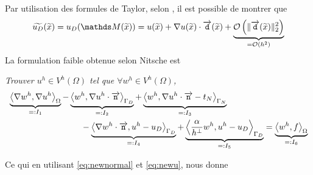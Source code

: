 \noindent Par utilisation des formules de Taylor, selon \citet{main_shifted_2018}, il est possible de montrer que
\begin{equation}
	\widetilde{u_D}(\widetilde{x})  = u_D (\mapgamma(\widetilde{x})) = u(\widetilde{x}) + \nabla u(\widetilde{x}) \cdot \dgamma (\widetilde{x}) + \underbrace{\OLandau{\|\dgamma(\widetilde{x})\|_2^2}}_{ = \OLandau{h^2}} \label{eq:newu}
\end{equation}
La formulation faible obtenue selon Nitsche est\\
\begin{refe}
\textit{Trouver $u^h\in V^h (\Omega)$ tel que $\forall w^h \in V^h (\Omega)$,}
\begin{align}
	&\underbrace{\scal{\nabla w^h}{\nabla u^h}_\Omega}_{ =: I_1} - \underbrace{\scal{w^h}{\nabla u^h \cdot \outngamma}_{\Gamma_D}}_{ =: I_{2}} +
	\underbrace{\scal{w^h}{\nabla u^h \cdot \outngamma - t_N}_{\Gamma_N}}_{ =: I_{3}}\nonumber\\
	&\hspace{3cm}-  \underbrace{\scal{\nabla w^h \cdot \outngamma}{u^h - u_D}_{\Gamma_D}}_{ =: I_{4}} +  \underbrace{\scal{\frac{\alpha}{h^{\perp}} w^h}{u^h - u_D}_{\Gamma_D}}_{ =: I_{5}}= \underbrace{\scal{w^h}{f}_{\Omega}}_{ =: I_6}
\end{align}
\end{refe}
Ce qui en utilisant \eqref{eq:newnormal} et \eqref{eq:newu}, nous donne
